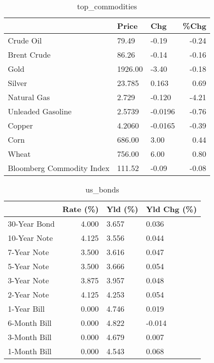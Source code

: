 \documentclass{article}%
\begin{document}
\begin{table}[htbp]%
\caption{top\_commodities}%
\centering%
\begin{adjustbox}{width=1\textwidth}%
\begin{tabular}{lllr}
\toprule
                          &   Price &     Chg &  \%Chg \\
\midrule
               Crude Oil  &   79.49 &   -0.19 & -0.24 \\
             Brent Crude  &   86.26 &   -0.14 & -0.16 \\
                    Gold  & 1926.00 &   -3.40 & -0.18 \\
                  Silver  &  23.785 &   0.163 &  0.69 \\
             Natural Gas  &   2.729 &  -0.120 & -4.21 \\
       Unleaded Gasoline  &  2.5739 & -0.0196 & -0.76 \\
                  Copper  &  4.2060 & -0.0165 & -0.39 \\
                    Corn  &  686.00 &    3.00 &  0.44 \\
                   Wheat  &  756.00 &    6.00 &  0.80 \\
Bloomberg Commodity Index &  111.52 &   -0.09 & -0.08 \\
\bottomrule
\end{tabular}
%
\end{adjustbox}%
\end{table}

%


\begin{table}[htbp]%
\caption{us\_bonds}%
\centering%
\begin{adjustbox}{width=1\textwidth}%
\begin{tabular}{lrll}
\toprule
             &  Rate (\%) & Yld (\%) & Yld Chg (\%) \\
\midrule
30-Year Bond &     4.000 &   3.657 &       0.036 \\
10-Year Note &     4.125 &   3.556 &       0.044 \\
 7-Year Note &     3.500 &   3.616 &       0.047 \\
 5-Year Note &     3.500 &   3.666 &       0.054 \\
 3-Year Note &     3.875 &   3.957 &       0.048 \\
 2-Year Note &     4.125 &   4.253 &       0.054 \\
 1-Year Bill &     0.000 &   4.746 &       0.019 \\
6-Month Bill &     0.000 &   4.822 &      -0.014 \\
3-Month Bill &     0.000 &   4.679 &       0.007 \\
1-Month Bill &     0.000 &   4.543 &       0.068 \\
\bottomrule
\end{tabular}
%
\end{adjustbox}%
\end{table}
\end{document}
